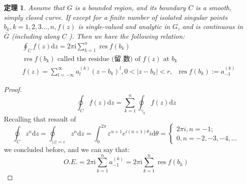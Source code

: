 \documentclass[10pt, a4paper, oneside]{ctexbook}
\newtheorem{theorem}{定理}[section]
\def\D{\mathrm{d}}
\begin{document}
\begin{theorem}
    Assume that $G$ is a bounded region, and its boundary $C$ is a smooth, simply closed curve. If except for a finite number of isolated singular points $b_{k}, k=1,2,3 \ldots, n, f(z)$ is single-valued and analytic in $G$, and is continuous in $\bar{G}$ (including along $C$ ). Then we have the following relation:
    \begin{align*}
         & \oint_{C} f(z) \D z=2 \pi \mathrm{i} \sum_{k=1}^{n} \operatorname{res} f\left(b_{k}\right)                                                  \\
         & \operatorname{res} f\left(b_{k}\right) \text { called the residue (留 数) of } f(z) \text { at } b_{k}                                      \\
         & f(z)=\sum_{l=-\infty}^{\infty} a_{l}^{(k)}\left(z-b_{k}\right)^{l}, 0<\left|z-b_{k}\right|<r,\;\; \operatorname{res} f(b_k) := a_{-1}^{(k)}
    \end{align*}
\end{theorem}
\begin{proof}
    \begin{equation*}
        \oint_{C} f(z) \D z=\sum_{k=1}^{n} \oint_{\gamma_{k}} f(z) \D z
    \end{equation*}
    Recalling that resault of
    \begin{equation*}
        \oint_{C} z^{n} \D z=\oint_{|z|=\varepsilon} z^{n} \D z=\int_{0}^{2 \pi} \varepsilon^{n+1} e^{i(n+1) \theta} i \D \theta=\left\{\begin{array}{l}
            2 \pi i, n=-1 ; \\
            0, n=-2,-3,-4, \ldots
        \end{array}\right.
    \end{equation*}
    we concluded before, and we can say that:
    \begin{equation*}
        O.E. =  2 \pi \mathrm{i} \sum_{k=1}^{n} a_{-1}^{(k)}=2 \pi \mathrm{i} \sum_{k=1}^{n} \operatorname{res} f\left(b_{k}\right)
    \end{equation*}
\end{proof}
\end{document}
